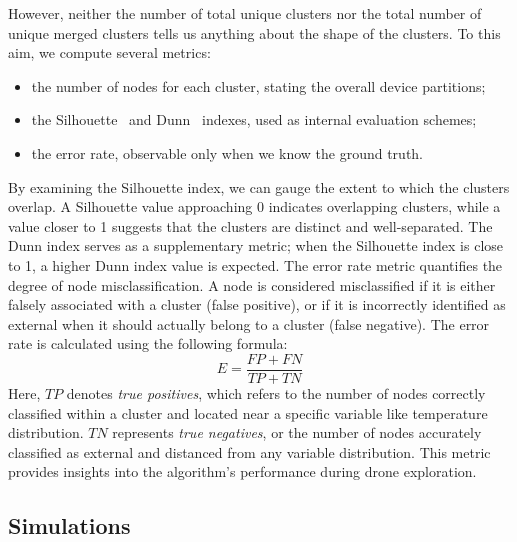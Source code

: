 However, neither the number of total unique clusters nor the total number of unique merged clusters
 tells us anything about the shape of the clusters.
 To this aim, we compute several metrics:
 \begin{itemize}
   \item the number of nodes for each cluster, stating the overall device partitions;
   \item the Silhouette~\cite{ROUSSEEUW198753} and Dunn~\cite{dunn1974well} indexes, used as internal
    evaluation schemes;
  \item the error rate, observable only when we know the ground truth.
 \end{itemize}
By examining the Silhouette index, we can gauge the extent to which the clusters overlap. 
 A Silhouette value approaching 0 indicates overlapping clusters, 
 while a value closer to 1 suggests that the clusters are distinct and well-separated. 
 The Dunn index serves as a supplementary metric; 
 when the Silhouette index is close to 1, a higher Dunn index value is expected.
%
The error rate metric quantifies the degree of node misclassification. 
 A node is considered misclassified if it is either falsely associated with a cluster 
 (false positive), or if it is incorrectly identified as external when it should actually belong to a cluster (false negative). 
 The error rate is calculated using the following formula:
 \[
   E = \frac{FP + FN}{TP + TN}
 \]
Here, 
 \( TP \) denotes \emph{true positives}, 
 which refers to the number of nodes correctly classified within a cluster and located near a specific variable like temperature distribution. 
 \( TN \) represents \emph{true negatives}, 
 or the number of nodes accurately classified as external and distanced from any variable distribution. 
 This metric provides insights into the algorithm's performance during drone exploration. 

\subsection{Simulations}\label{s:simulations}



